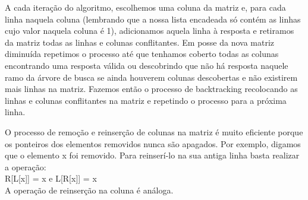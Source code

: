 \documentclass{article}
\begin{document}
A cada iteração do algoritmo, escolhemos uma coluna da matriz e, para cada linha naquela coluna (lembrando que a nossa lista encadeada
só contém as linhas cujo valor naquela coluna é 1),
adicionamos aquela linha à resposta e retiramos da matriz todas as linhas e colunas conflitantes. Em posse 
da nova matriz diminuída repetimos o processo até que tenhamos coberto todas as colunas encontrando uma resposta válida
ou descobrindo que não há resposta naquele ramo da árvore de busca se ainda houverem colunas descobertas e não existirem 
mais linhas na matriz. Fazemos então o processo de backtracking recolocando as linhas e colunas conflitantes na matriz e 
repetindo o processo para a próxima linha.

O processo de remoção e reinserção de colunas na matriz é muito eficiente porque os ponteiros dos elementos removidos 
nunca são apagados. Por exemplo, digamos que o elemento x foi removido. Para reinserí-lo na sua antiga linha basta 
realizar a operação: \\

R[L[x]] = x e L[R[x]] = x \\

A operação de reinserção na coluna é análoga. 
\end{document}
